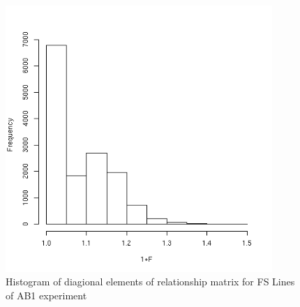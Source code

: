 %

\begin{figure}[!h]
  \centering
   \includegraphics[width=0.9\textwidth]{inbfs.png}
  \caption{Histogram of diagional elements of relationship matrix for FS Lines of AB1 experiment}
  \label{fig:inbfs}
\end{figure}

%

